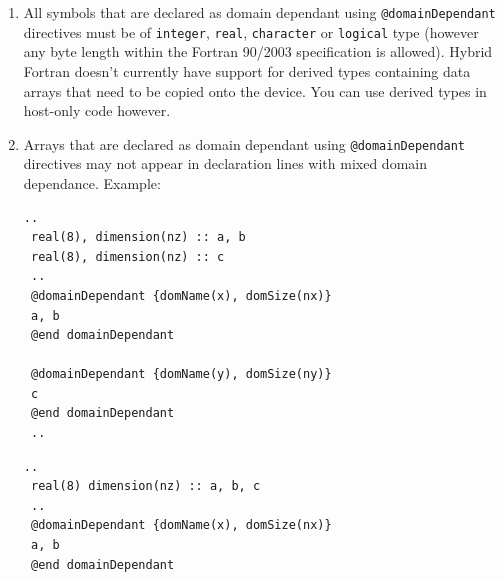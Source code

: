 \begin{enumerate}
 \item All symbols that are declared as domain dependant using \verb|@domainDependant| directives must be of \verb|integer|, \verb|real|, \verb|character| or \verb|logical| type (however any byte length within the Fortran 90/2003 specification is allowed). Hybrid Fortran doesn't currently have support for derived types containing data arrays that need to be copied onto the device. You can use derived types in host-only code however.
 \item Arrays that are declared as domain dependant using \verb|@domainDependant| directives may not appear in declaration lines with mixed domain dependance. Example:
 \begin{lstlisting}[name=exampleMixedOK, label=listing:exampleMixedOK, caption={This is ok.}]
 ..
 real(8), dimension(nz) :: a, b
 real(8), dimension(nz) :: c
 ..
 @domainDependant {domName(x), domSize(nx)}
 a, b
 @end domainDependant

 @domainDependant {domName(y), domSize(ny)}
 c
 @end domainDependant
 ..
 \end{lstlisting}

 \begin{lstlisting}[name=exampleMixedNotOK, label=listing:exampleMixedNotOK, caption={This is not ok.}]
 ..
 real(8) dimension(nz) :: a, b, c
 ..
 @domainDependant {domName(x), domSize(nx)}
 a, b
 @end domainDependant


\end{lstlisting}
\end{enumerate}
